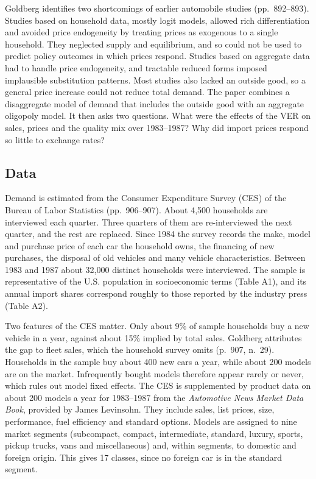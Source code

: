 Goldberg identifies two shortcomings of earlier automobile studies (pp.~892--893). Studies based on household
data, mostly logit models, allowed rich differentiation and avoided price endogeneity by treating prices as
exogenous to a single household. They neglected supply and equilibrium, and so could not be used to predict
policy outcomes in which prices respond. Studies based on aggregate data had to handle price endogeneity, and
tractable reduced forms imposed implausible substitution patterns. Most studies also lacked an outside good, so
a general price increase could not reduce total demand. The paper combines a disaggregate model of demand that
includes the outside good with an aggregate oligopoly model. It then asks two questions. What were the effects
of the VER on sales, prices and the quality mix over 1983--1987? Why did import prices respond so little to
exchange rates?

\subsection{Data}\label{sec:08-goldberg-data}

Demand is estimated from the Consumer Expenditure Survey (CES) of the Bureau of Labor Statistics (pp.~906--907).
About 4,500 households are interviewed each quarter. Three quarters of them are re-interviewed the next
quarter, and the rest are replaced. Since 1984 the survey records the make, model and purchase price of each
car the household owns, the financing of new purchases, the disposal of old vehicles and many vehicle
characteristics. Between 1983 and 1987 about 32,000 distinct households were interviewed. The sample is
representative of the U.S. population in socioeconomic terms (Table A1), and its annual import shares correspond
roughly to those reported by the industry press (Table A2).

Two features of the CES matter. Only about 9\% of sample households buy a new vehicle in a year, against about
15\% implied by total sales. Goldberg attributes the gap to fleet sales, which the household survey omits
(p.~907, n.~29). Households in the sample buy about 400 new cars a year, while about 200 models are on the
market. Infrequently bought models therefore appear rarely or never, which rules out model fixed effects. The CES
is supplemented by product data on about 200 models a year for 1983--1987 from the \emph{Automotive News Market
Data Book}, provided by James Levinsohn. They include sales, list prices, size, performance, fuel efficiency and
standard options. Models are assigned to nine market segments (subcompact, compact, intermediate, standard,
luxury, sports, pickup trucks, vans and miscellaneous) and, within segments, to domestic and foreign origin.
This gives 17 classes, since no foreign car is in the standard segment.


